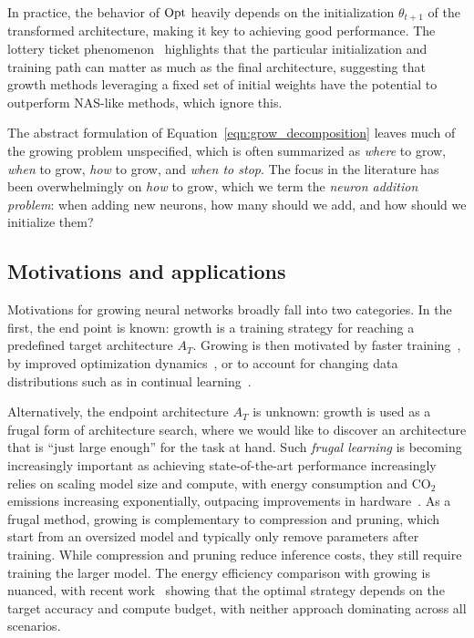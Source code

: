 In practice, the behavior of $\operatorname*{\text{Opt}}$ heavily depends on the initialization $\theta_{t+1}$ of the transformed architecture, making it key to achieving good performance. The lottery ticket phenomenon~\citep{frankle_lottery_2019,chen_elastic_2021} highlights that the particular initialization and training path can matter as much as the final architecture, suggesting that growth methods leveraging a fixed set of initial weights have the potential to outperform NAS-like methods, which ignore this.

The abstract formulation of Equation~\eqref{eqn:grow_decomposition} leaves much of the growing problem unspecified, which is often summarized as \emph{where} to grow, \emph{when} to grow, \emph{how} to grow, and \emph{when to stop}. The focus in the literature has been overwhelmingly on \emph{how} to grow, which we term the \emph{neuron addition problem}: when adding new neurons, how many should we add, and how should we initialize them? 

\subsection{Motivations and applications}

Motivations for growing neural networks broadly fall into two categories. In the first, the end point is known: growth is a training strategy for reaching a predefined target architecture $A_T$. Growing is then motivated by faster training~\citep{evci_gradmax_2022,yuan_accelerated_2023}, by improved optimization dynamics~\citep{wu_when_2024,caillon_growing_2021}, or to account for changing data distributions such as in continual learning~\citep{yoon_lifelong_2018,li_learn_2019,yang_grown_2021}.

Alternatively, the endpoint architecture $A_T$ is unknown: growth is used as a frugal form of architecture search, where we would like to discover an architecture that is ``just large enough'' for the task at hand. Such \emph{frugal learning} is becoming increasingly important as achieving state-of-the-art performance increasingly relies on scaling model size and compute, with energy consumption and $\mathrm{CO_2}$ emissions increasing exponentially, outpacing improvements in hardware~\citep{thompson_deep_2021,morand_environmental_2025}. As a frugal method, growing is complementary to compression and pruning, which start from an oversized model and typically only remove parameters after training. While compression and pruning reduce inference costs, they still require training the larger model. The energy efficiency comparison with growing is nuanced, with recent work~\citep{boumendil_grow_2023} showing that the optimal strategy depends on the target accuracy and compute budget, with neither approach dominating across all scenarios.
    
